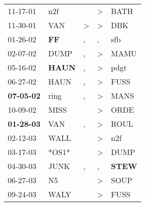 \begin{supertabular}{p{0.07\textwidth}p{0.06\textwidth}p{0.02\textwidth}p{0.02\textwidth}p{0.06\textwidth}}
          11-17-01\textsuperscript{} &            n2f\textsuperscript{} &                  &     \textgreater &           BATH\textsuperscript{} \\
          11-30-01\textsuperscript{} &            VAN\textsuperscript{} &     \textgreater &     \textgreater &            DBK\textsuperscript{} \\
          01-26-02\textsuperscript{} &    \textbf{FF\textsuperscript{}} &                , &                , &            sfb\textsuperscript{} \\
          02-07-02\textsuperscript{} &           DUMP\textsuperscript{} &                , &     \textgreater &           MAMU\textsuperscript{} \\
          05-16-02\textsuperscript{} &  \textbf{HAUN\textsuperscript{}} &                , &     \textgreater &           pdgt\textsuperscript{} \\
          06-27-02\textsuperscript{} &           HAUN\textsuperscript{} &                , &     \textgreater &           FUSS\textsuperscript{} \\
 \textbf{07-05-02\textsuperscript{}} &           ring\textsuperscript{} &                , &     \textgreater &           MANS\textsuperscript{} \\
          10-09-02\textsuperscript{} &           MISS\textsuperscript{} &                  &     \textgreater &           ORDE\textsuperscript{} \\
 \textbf{01-28-03\textsuperscript{}} &            VAN\textsuperscript{} &                , &     \textgreater &           ROUL\textsuperscript{} \\
          02-12-03\textsuperscript{} &           WALL\textsuperscript{} &                  &     \textgreater &            n2f\textsuperscript{} \\
          03-17-03\textsuperscript{} &                            *OS1* &                  &     \textgreater &           DUMP\textsuperscript{} \\
          04-30-03\textsuperscript{} &           JUNK\textsuperscript{} &                , &                , &  \textbf{STEW\textsuperscript{}} \\
          06-27-03\textsuperscript{} &             N5\textsuperscript{} &                  &     \textgreater &           SOUP\textsuperscript{} \\
          09-24-03\textsuperscript{} &           WALY\textsuperscript{} &                  &     \textgreater &           FUSS\textsuperscript{} \\

\end{supertabular}
